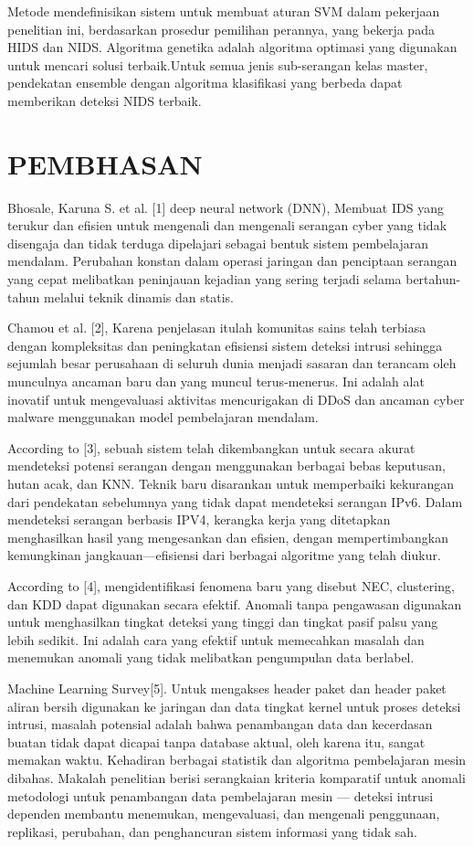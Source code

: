 \documentclass[conference]{IEEEtran}
\begin{document}
Metode mendefinisikan sistem untuk membuat aturan SVM dalam pekerjaan penelitian ini, berdasarkan prosedur pemilihan perannya, yang bekerja pada HIDS dan NIDS. Algoritma genetika adalah algoritma optimasi yang digunakan untuk mencari solusi terbaik.Untuk semua jenis sub-serangan kelas master, pendekatan ensemble dengan algoritma klasifikasi yang berbeda dapat memberikan deteksi NIDS terbaik.

\section{PEMBHASAN}

Bhosale, Karuna S. et al. [1] deep neural network (DNN), Membuat IDS yang terukur dan efisien untuk mengenali dan mengenali serangan cyber yang tidak disengaja dan tidak terduga dipelajari sebagai bentuk sistem pembelajaran mendalam. Perubahan konstan dalam operasi jaringan dan penciptaan serangan yang cepat melibatkan peninjauan kejadian yang sering terjadi selama bertahun-tahun melalui teknik dinamis dan statis.

Chamou et al. [2], Karena penjelasan itulah komunitas sains telah terbiasa dengan kompleksitas dan peningkatan efisiensi sistem deteksi intrusi sehingga sejumlah besar perusahaan di seluruh dunia menjadi sasaran dan terancam oleh munculnya ancaman baru dan yang muncul terus-menerus. Ini adalah alat inovatif untuk mengevaluasi aktivitas mencurigakan di DDoS dan ancaman cyber malware menggunakan model pembelajaran mendalam.

According to [3], sebuah sistem telah dikembangkan untuk secara akurat mendeteksi potensi serangan dengan menggunakan berbagai bebas keputusan, hutan acak, dan KNN. Teknik baru disarankan untuk memperbaiki kekurangan dari pendekatan sebelumnya yang tidak dapat mendeteksi serangan IPv6. Dalam mendeteksi serangan berbasis IPV4, kerangka kerja yang ditetapkan menghasilkan hasil yang mengesankan dan efisien, dengan mempertimbangkan kemungkinan jangkauan—efisiensi dari berbagai algoritme yang telah diukur. 

According to [4], mengidentifikasi fenomena baru yang disebut NEC, clustering, dan KDD dapat digunakan secara efektif. Anomali tanpa pengawasan digunakan untuk menghasilkan tingkat deteksi yang tinggi dan tingkat pasif palsu yang lebih sedikit. Ini adalah cara yang efektif untuk memecahkan masalah dan menemukan anomali yang tidak melibatkan pengumpulan data berlabel.

Machine Learning Survey[5]. Untuk mengakses header paket dan header paket aliran bersih digunakan ke jaringan dan data tingkat kernel untuk proses deteksi intrusi, masalah potensial adalah bahwa penambangan data dan kecerdasan buatan tidak dapat dicapai tanpa database aktual, oleh karena itu, sangat memakan waktu. Kehadiran berbagai statistik dan algoritma pembelajaran mesin dibahas. Makalah penelitian berisi serangkaian kriteria komparatif untuk anomali metodologi untuk penambangan data pembelajaran mesin — deteksi intrusi dependen membantu menemukan, mengevaluasi, dan mengenali penggunaan, replikasi, perubahan, dan penghancuran sistem informasi yang tidak sah.
\end{document}
